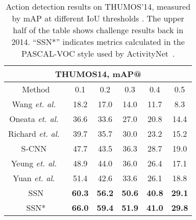 \documentclass[10pt,twocolumn,letterpaper]{article}
\begin{document}
\begin{table}[t]
	\begin{center}
		\begin{tabular}{c|ccccc}
			\hline
			\multicolumn{6}{c}{\textbf{THUMOS14}, \textbf{mAP@}}                 \\ \hline
			Method& 0.1  & 0.2  & 0.3  & 0.4  & 0.5  \\ \hline
			Wang \emph{et. al.}~\cite{wang2014action} & 18.2 & 17.0 & 14.0 & 11.7 & 8.3 \\ \hline
			Oneata \emph{et. al.}~\cite{oneata2014lear} & 36.6 & 33.6 & 27.0 &  20.8 & 14.4 \\ \hline
			Richard \emph{et. al.}~\cite{Richard2016Language} & 39.7 & 35.7 & 30.0 & 23.2 & 15.2 \\ \hline\hline
			S-CNN~\cite{Shou2016SCNN} & 47.7 & 43.5 & 36.3 & 28.7 & 19.0 \\ \hline
			Yeung \emph{et. al.}~\cite{Yeung2016FrameGlimpse} & 48.9 & 44.0 & 36.0 & 26.4 & 17.1 \\ \hline
			Yuan \emph{et. al.}~\cite{Yuan2016ScorePyramids} & 51.4 & 42.6& 33.6&26.1&18.8 \\\hline\hline
			SSN & \textbf{60.3} & \textbf{56.2} & \textbf{50.6} & \textbf{40.8} & \textbf{29.1} \\
			\hline
			SSN* & \textbf{66.0} & \textbf{59.4} & \textbf{51.9} & \textbf{41.0} & \textbf{29.8} \\
			\hline
		\end{tabular}
	\end{center}
	\caption{\small
		Action detection results on THUMOS’14, measured by mAP at different IoU thresholds . The upper half of the table shows challenge results back in 2014. ``SSN*'' indicates metrics calculated in the PASCAL-VOC style used by ActivityNet~\cite{caba2015activitynet}.
	}
	\label{table: thumos14}
	\vspace{-5pt}
\end{table}
\end{document}

